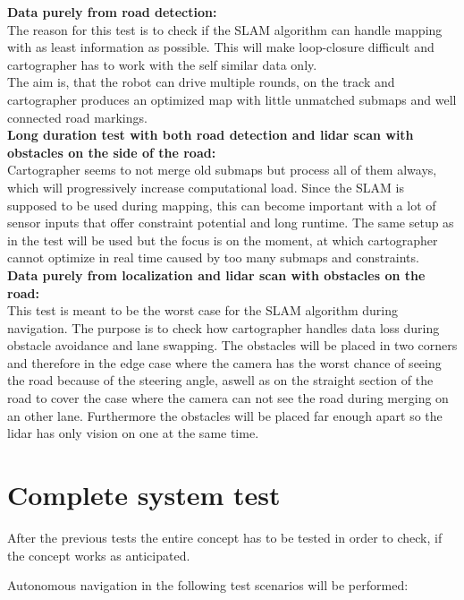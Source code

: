 \textbf{Data purely from road detection:}\\
The reason for this test is to check if the SLAM algorithm can handle mapping with as least information as possible. This will make loop-closure difficult and cartographer has to work with the self similar data only.\\
The aim is, that the robot can drive multiple rounds, on the track and cartographer produces an optimized map with little unmatched submaps and well connected road markings.\\

\textbf{Long duration test with both road detection and lidar scan with obstacles on the side of the road:}\\
Cartographer seems to not merge old submaps but process all of them always, which will progressively increase computational load. Since the SLAM is supposed to be used during mapping, this can become important with a lot of sensor inputs that offer constraint potential and long runtime.
The same setup as in the  test will be used but the focus is on the moment, at which cartographer cannot optimize in real time caused by too many submaps and constraints.\\


\textbf{Data purely from localization and lidar scan with obstacles on the road:}\\
This test is meant to be the worst case for the SLAM algorithm during navigation. The purpose is to check how cartographer handles data loss during obstacle avoidance and lane swapping.
The obstacles will be placed in two corners and therefore in the edge case where the camera has the worst chance of seeing the road because of the steering angle, aswell as on the straight section of the road to cover the case where the camera can not see the road during merging on an other lane. Furthermore the obstacles will be placed far enough apart so the lidar has only vision on one at the same time.\\


\section{Complete system test}

After the previous tests the entire concept has to be tested in order to check, if the concept works as anticipated.

Autonomous navigation in the following test scenarios will be performed:

